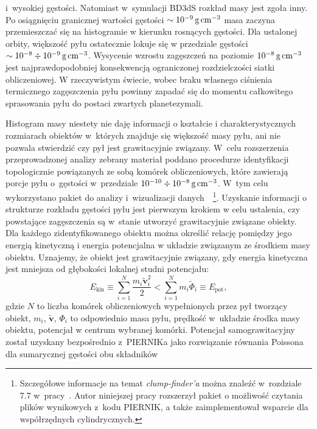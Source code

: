 i~wysokiej gęstości.  Natomiast w~symulacji BD3dS rozkład masy jest zgoła inny.
Po osiągnięciu granicznej wartości gęstości $\sim10^{-9}\hbox{$\thinspace\textrm{g}$}\hbox{$\thinspace\textrm{cm}$}^{-3}$ masa zaczyna
przemieszczać się na histogramie w kierunku rosnących gęstości. Dla ustalonej
orbity, większość pyłu ostatecznie lokuje się w przedziale gęstości
$\sim10^{-8}\div10^{-9}\hbox{$\thinspace\textrm{g}$}\hbox{$\thinspace\textrm{cm}$}^{-3}$.  Wysycenie wzrostu zagęszczeń na poziomie
$10^{-8}\hbox{$\thinspace\textrm{g}$}\hbox{$\thinspace\textrm{cm}$}^{-3}$ jest najprawdopodobniej konsekwencją
ograniczonej rozdzielczości siatki obliczeniowej. W rzeczywistym świecie, wobec
braku własnego ciśnienia termicznego zagęszczenia pyłu powinny zapadać się do
momentu całkowitego sprasowania pyłu do postaci zwartych planetezymali.
\par Histogram masy niestety nie daję informacji o kształcie i
charakterystycznych rozmiarach obiektów w~których znajduje się większość masy pyłu,
ani nie pozwala stwierdzić czy pył jest grawitacyjnie związany. W~celu
rozszerzenia przeprowadzonej analizy zebrany materiał poddano procedurze
identyfikacji topologicznie powiązanych ze sobą komórek obliczeniowych, które
zawierają porcje pyłu o~gęstości w~przedziale $10^{-10}\div10^{-8}\hbox{$\thinspace\textrm{g}$}\hbox{$\thinspace\textrm{cm}$}^{-3}$. W~tym
celu wykorzystano pakiet do analizy i~wizualizacji
danych~\yt{}~\footnote{Szczegółowe informacje na temat \emph{clump-finder'a}
można znaleźć w~rozdziale 7.7 w~pracy~\cite{yt}. Autor niniejszej pracy
rozszerzył pakiet \yt{} o możliwość czytania plików wynikowych z~kodu
PIERNIK, a także zaimplementował wsparcie dla współrzędnych cylindrycznych.}.
Uzyskanie informacji o strukturze rozkładu gęstości pyłu jest pierwszym krokiem w
celu ustalenia, czy powstające zagęszczenia są w~stanie utworzyć grawitacyjnie
związane obiekty. Dla każdego zidentyfikowanego obiektu można
określić relację pomiędzy jego energią kinetyczną i energia potencjalna
w układzie związanym ze środkiem masy obiektu. Uznajemy, że obiekt jest
grawitacyjnie związany, gdy energia kinetyczna jest mniejsza od głębokości
lokalnej studni potencjału:
%
\begin{equation}
   \label{eq:bcrit}
   E_{\textrm{kin}} \equiv \sum\limits_{i=1}^N \frac{m_i\tilde{\mathbf{v}}_i^2}{2} 
   < \sum\limits_{i=1}^N m_i\tilde{\Phi}_i \equiv E_{\textrm{pot}},
\end{equation}
%
gdzie $N$ to liczba komórek obliczeniowych wypełnionych przez pył tworzący
obiekt, $m_i$, $\tilde{\mathbf{v}}$, $\Phi_i$ to odpowiednio masa pyłu, prędkość
w~układzie środka masy obiektu, potencjał w centrum wybranej komórki. Potencjał
samograwitacyjny został uzyskany bezpośrednio z~PIERNIKa jako rozwiązanie
równania Poissona~ dla sumarycznej gęstości obu składników
